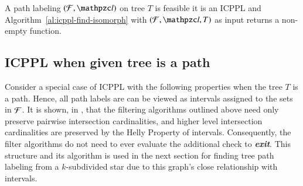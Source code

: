 \documentclass[MS,]{iitmdiss}
\begin{document}
\begin{theorem}
  \label{th:charac}
  A path labeling $(\cF, \cl)$ on tree $T$ is feasible \iff it is an
  ICPPL and Algorithm~\ref{al:icppl-find-isomorph} with $(\cF, \cl,
  T)$ as input returns a non-empty function.
\end{theorem}

\subsection*{ICPPL when given tree is a path}
\label{subsec:icpplicpia}
Consider a special case of ICPPL with the following properties when
the tree $T$ is a path.  Hence, all path labels are can be viewed as
intervals assigned to the sets in ${\cal F}$.  It is shown, in
\cite{nsnrs09}, that the filtering algorithms outlined above need only
preserve pairwise intersection cardinalities, and higher level
intersection cardinalities are preserved by the Helly Property of
intervals.  Consequently, the filter algorithms do not need to ever
evaluate the additional check to {\em \bf exit}.
This structure and its algorithm is
used in the next section for finding tree path labeling from a
$k$-subdivided star due to this graph's close relationship with
intervals. 
\end{document}
